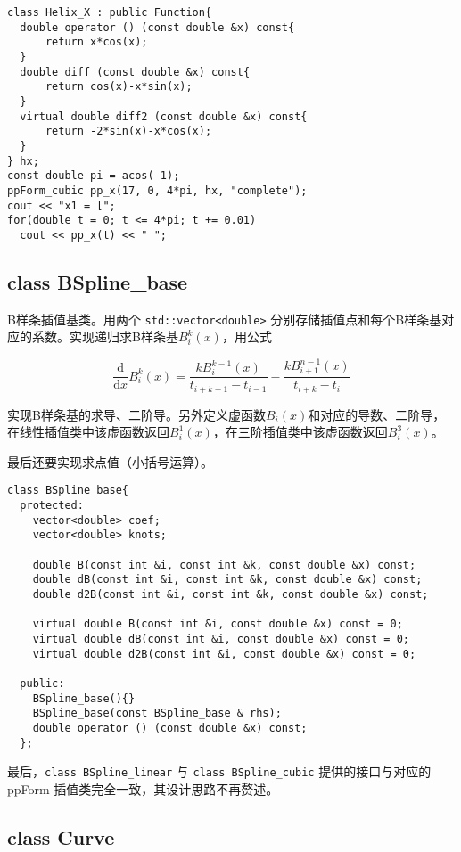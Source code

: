 \documentclass[lang=cn,11pt,a4paper]{elegantpaper}
\begin{document}
\begin{lstlisting}
class Helix_X : public Function{
  double operator () (const double &x) const{
      return x*cos(x);
  }
  double diff (const double &x) const{
      return cos(x)-x*sin(x);
  }
  virtual double diff2 (const double &x) const{
      return -2*sin(x)-x*cos(x);
  }
} hx;
const double pi = acos(-1);
ppForm_cubic pp_x(17, 0, 4*pi, hx, "complete");
cout << "x1 = [";
for(double t = 0; t <= 4*pi; t += 0.01)
  cout << pp_x(t) << " ";
\end{lstlisting}

\subsection{class BSpline\_base}

B样条插值基类。用两个 \verb|std::vector<double>| 分别存储插值点和每个B样条基对应的系数。实现递归求B样条基$B_i^k(x)$，用公式

\begin{equation*}
  \frac{\text{d}}{\text{d} x} B_i^k(x) = \frac{k B_i^{k-1}(x)}{t_{i+k+1} - t_{i-1}} - \frac{k B_{i+1}^{n-1}(x)}{t_{i+k} - t_i}
\end{equation*}

实现B样条基的求导、二阶导。另外定义虚函数$B_i(x)$和对应的导数、二阶导，在线性插值类中该虚函数返回$B_i^1(x)$，在三阶插值类中该虚函数返回$B_i^3(x)$。

最后还要实现求点值（小括号运算）。

\begin{lstlisting}
class BSpline_base{
  protected:
    vector<double> coef;
    vector<double> knots;
    
    double B(const int &i, const int &k, const double &x) const;
    double dB(const int &i, const int &k, const double &x) const;
    double d2B(const int &i, const int &k, const double &x) const;

    virtual double B(const int &i, const double &x) const = 0;
    virtual double dB(const int &i, const double &x) const = 0;
    virtual double d2B(const int &i, const double &x) const = 0;
  
  public:
    BSpline_base(){}
    BSpline_base(const BSpline_base & rhs);
    double operator () (const double &x) const;
  };
\end{lstlisting}

最后，\verb|class BSpline_linear| 与 \verb|class BSpline_cubic| 提供的接口与对应的 ppForm 插值类完全一致，其设计思路不再赘述。

\subsection{class Curve}
\end{document}
